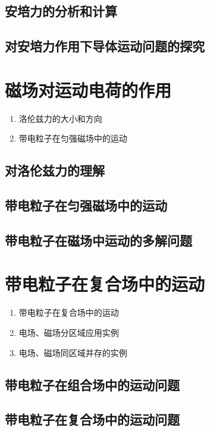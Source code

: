 \documentclass[cn,11pt, simple]{elegantbook}
\begin{document}
\clearpage\section{安培力的分析和计算}

\clearpage\section{对安培力作用下导体运动问题的探究}

\chapter{磁场对运动电荷的作用}
\begin{enumerate}
   \item 洛伦兹力的大小和方向
   \item 带电粒子在匀强磁场中的运动
\end{enumerate}

\clearpage\section{对洛伦兹力的理解}

\clearpage\section{带电粒子在匀强磁场中的运动}

\clearpage\section{带电粒子在磁场中运动的多解问题}

\chapter{带电粒子在复合场中的运动}
\begin{enumerate}
   \item 带电粒子在复合场中的运动
   \item 电场、磁场分区域应用实例
   \item 电场、磁场同区域并存的实例
\end{enumerate}

\clearpage\section{带电粒子在组合场中的运动问题}

\clearpage\section{带电粒子在复合场中的运动问题}
\end{document}
